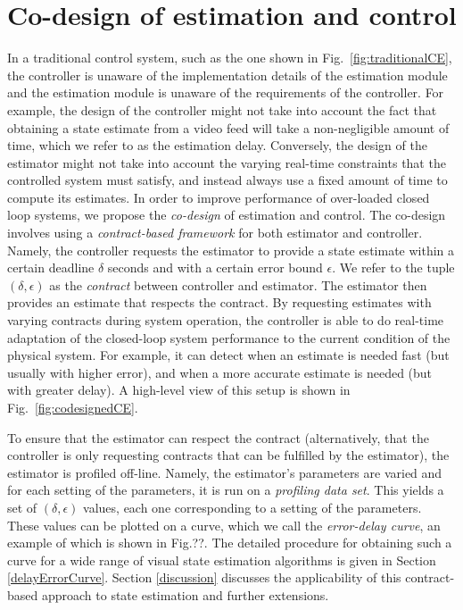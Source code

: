 
\section{Co-design of estimation and control}
\label{sec:codesign}
In a traditional control system, such as the one shown in Fig.~\ref{fig:traditionalCE}, the controller is unaware of the implementation details of the estimation module and the estimation module is unaware of the requirements of the controller. 
For example, the design of the controller might not take into account the fact that obtaining a state estimate from a video feed will take a non-negligible amount of time, which we refer to as the estimation delay.
Conversely, the design of the estimator might not take into account the varying real-time constraints that the controlled system must satisfy, and instead always use a fixed amount of time to compute its estimates.
In order to improve performance of over-loaded closed loop systems, we propose the \emph{co-design} of estimation and control. 
The co-design involves using a \emph{contract-based framework} for both estimator and controller.
Namely, the controller requests the estimator to provide a state estimate within a certain deadline $\delta$ seconds and with a certain error bound $\epsilon$.
We refer to the tuple $(\delta,\epsilon)$ as the \emph{contract} between controller and estimator.
The estimator then provides an estimate that respects the contract.
By requesting estimates with varying contracts during system operation, the controller is able to do real-time adaptation of the closed-loop system performance to the current condition of the physical system.
For example, it can detect when an estimate is needed fast (but usually with higher error), and when a more accurate estimate is needed (but with greater delay).
A high-level view of this setup is shown in Fig.~\ref{fig:codesignedCE}. 

To ensure that the estimator can respect the contract (alternatively, that the controller is only requesting contracts that can be fulfilled by the estimator), the estimator is profiled off-line.
Namely, the estimator's parameters are varied and for each setting of the parameters, it is run on a \emph{profiling data set}. 
This yields a set of $(\delta,\epsilon)$ values, each one corresponding to a setting of the parameters.
These values can be plotted on a curve, which we call the \emph{error-delay curve}, an example of which is shown in Fig.??.
The detailed procedure for obtaining such a curve for a wide range of visual state estimation algorithms is given in Section \ref{delayErrorCurve}.
Section \ref{discussion} discusses the applicability of this contract-based approach to state estimation and further extensions.

